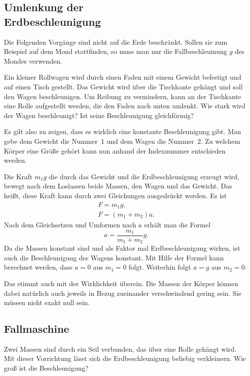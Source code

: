 \documentclass[a4paper,10pt,fleqn,twocolumn,twoside]{article}
\begin{document}
\subsection[Umlenkung der Erdbeschleunigung]
{Umlenkung der\\ Erdbeschleunigung}

Die Folgenden Vorgänge sind nicht auf die Erde beschränkt. Sollen
sie zum Beispiel auf dem Mond stattfinden, so muss man nur die
Fallbeschleuinung \(g\) des Mondes verwenden.

Ein kleiner Rollwagen wird durch einen Faden mit einem Gewicht
befestigt und auf einen Tisch gestellt. Das Gewicht wird über die
Tischkante gehängt und soll den Wagen beschleunigen. Um Reibung zu
vermindern, kann an der Tischkante eine Rolle aufgestellt werden, die
den Faden nach unten umlenkt. Wie stark wird der Wagen beschleunigt?
Ist seine Beschleunigung gleichförmig?

Es gilt also zu zeigen, dass es wirklich eine konstante Beschleunigung
gibt. Man gebe dem Gewicht die Nummer~1 und dem Wagen die Nummer~2.
Zu welchem Körper eine Größe gehört kann nun anhand der Indexnummer
entschieden werden.

Die Kraft \({m_1}g\) die durch das Gewicht und die Erdbeschleunigung
erzeugt wird, bewegt nach dem Loslassen beide Massen, den Wagen und das
Gewicht. Das heißt, diese Kraft kann durch zwei Gleichungen ausgedrückt
werden. Es ist
\begin{gather*}
F = {m_1}g,\\
F = (m_1+m_2)a.
\end{gather*}
Nach dem Gleichsetzen und Umformen nach \(a\) erhält man die Formel
\[a = \frac{m_1}{m_1+m_2} g.\]
Da die Massen konstant sind und als Faktor mal Erdbeschleunigung
wirken, ist auch die Beschleunigung des Wagens konstant. Mit Hilfe
der Formel kann berechnet werden, dass \(a=0\) aus \(m_1=0\) folgt.
Weiterhin folgt \(a=g\) aus \(m_2=0\).

Das stimmt auch mit der Wirklichkeit überein. Die Massen der Körper
können dabei natürlich auch jeweils in Bezug zueinander verschwindend
gering sein. Sie müssen nicht exakt null sein.

\subsection{Fallmaschine}

Zwei Massen sind durch ein Seil verbunden, das über eine Rolle gehängt
wird. Mit dieser Vorrichtung lässt sich die Erdbeschleunigung beliebig
verkleinern. Wie groß ist die Beschleunigung?
\end{document}
